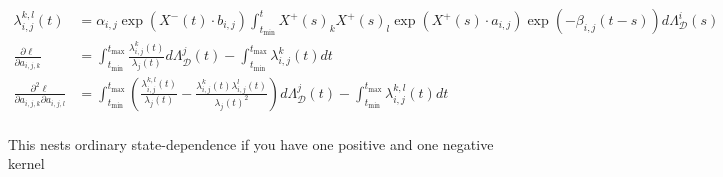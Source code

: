 \documentclass[honours,12pt]{unswthesis}
\numberwithin{equation}{section}
\begin{document}
\begin{equation*}
\begin{align}
		\lambda_{i,j}^{k,l}(t) &= \alpha_{i,j} \exp(X^-(t)\cdot b_{i,j})\int_{t_\mathrm{min}}^t X^+(s)_k X^+(s)_l \exp(X^+(s)\cdot a_{i,j}) \exp(-\beta_{i,j}(t-s)) d\Lambda_\mathcal{D}^i(s) \\
		\frac{\partial\ell}{\partial a_{i,j,k}} &= \int_{t_\mathrm{min}}^{t_\mathrm{max}} \frac{\lambda_{i,j}^k(t)}{\lambda_j(t)}d\Lambda_\mathcal{D}^j(t) - \int_{t_\mathrm{min}}^{t_\mathrm{max}} \lambda_{i,j}^k(t)dt\\
		\frac{\partial^2\ell}{\partial a_{i,j,k}\partial a_{i,j,l}} &= \int_{t_\mathrm{min}}^{t_\mathrm{max}} \left( \frac{\lambda_{i,j}^{k,l}(t)}{\lambda_j(t)} - \frac{\lambda_{i,j}^k(t)\lambda_{i,j}^l(t)}{\lambda_j(t)^2} \right) d\Lambda_\mathcal{D}^j(t) - \int_{t_\mathrm{min}}^{t_\mathrm{max}} \lambda_{i,j}^{k,l}(t)dt\\
	\end{align}
\end{equation*}

This nests ordinary state-dependence if you have one positive and one negative kernel
\end{document}
